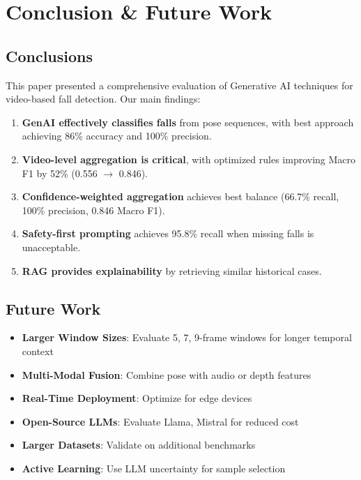 \documentclass[conference]{IEEEtran}
\begin{document}
\section{Conclusion \& Future Work}

\subsection{Conclusions}

This paper presented a comprehensive evaluation of Generative AI techniques for video-based fall detection. Our main findings:

\begin{enumerate}[leftmargin=*]
    \item \textbf{GenAI effectively classifies falls} from pose sequences, with best approach achieving 86\% accuracy and 100\% precision.
    
    \item \textbf{Video-level aggregation is critical}, with optimized rules improving Macro F1 by 52\% (0.556 $\rightarrow$ 0.846).
    
    \item \textbf{Confidence-weighted aggregation} achieves best balance (66.7\% recall, 100\% precision, 0.846 Macro F1).
    
    \item \textbf{Safety-first prompting} achieves 95.8\% recall when missing falls is unacceptable.
    
    \item \textbf{RAG provides explainability} by retrieving similar historical cases.
\end{enumerate}

\subsection{Future Work}

\begin{itemize}[leftmargin=*]
    \item \textbf{Larger Window Sizes}: Evaluate 5, 7, 9-frame windows for longer temporal context
    \item \textbf{Multi-Modal Fusion}: Combine pose with audio or depth features
    \item \textbf{Real-Time Deployment}: Optimize for edge devices
    \item \textbf{Open-Source LLMs}: Evaluate Llama, Mistral for reduced cost
    \item \textbf{Larger Datasets}: Validate on additional benchmarks
    \item \textbf{Active Learning}: Use LLM uncertainty for sample selection
\end{itemize}
\end{document}
